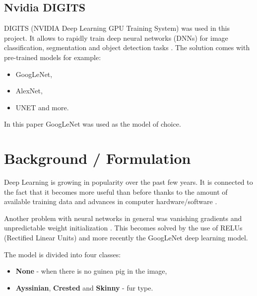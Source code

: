\documentclass[10pt,journal,compsoc]{IEEEtran}
\begin{document}
    
    \subsection{Nvidia DIGITS}
    DIGITS (NVIDIA Deep Learning GPU Training System) was used in this project. It allows to rapidly train deep neural networks (DNNs) for image classification, segmentation and object detection tasks \cite{digitswww}. \newline\newline
    The solution comes with pre-trained models for example:

    \begin{itemize}
        \item GoogLeNet,
        \item AlexNet,
        \item UNET and more.        
    \end{itemize}
    \noindent
    In this paper GoogLeNet was used as the model of choice.
    
    \section{Background / Formulation}
    Deep Learning is growing in popularity over the past few years. It is connected to the fact that it becomes more useful than before thanks to the amount of available training data and advances in computer hardware/software \cite{dl}. 

    Another problem with neural networks in general was vanishing gradients and unpredictable weight initialization \cite{glnp}. This becomes solved by the use of RELUs (Rectified Linear Units)\cite{relu} and more recently the GoogLeNet deep learning model\cite{dwc}.

    The model is divided into four classes:
    \begin{itemize}
        \item \textbf{None} - when there is no guinea pig in the image,
        \item \textbf{Ayssinian}, \textbf{Crested} and \textbf{Skinny} - fur type.
    \end{itemize}
    
\end{document}
